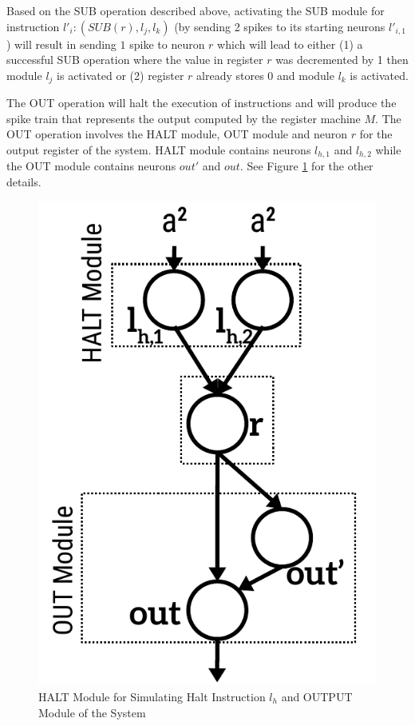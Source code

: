 \documentclass[smallextended]{svjour3}
\begin{document}

Based on the SUB operation described above, activating the SUB module for instruction $l'_i:(SUB(r),l_j,l_k)$ (by sending 2 spikes to its starting 
neurons  $l'_{i,1}$) will result in sending $1$ spike to neuron $r$ which will lead to either (1) a successful SUB operation where the value in 
register $r$ was decremented by 1 then module $l_j$ is activated or (2) register $r$ already stores 0 and module $l_k$ is activated.


The OUT operation will halt the execution of instructions and will produce the spike train that represents the output computed by the register 
machine $M.$ The OUT operation involves the HALT module, OUT module and neuron $r$ for the output register of the system. HALT module contains 
neurons $l_{h,1}$ and $l_{h,2}$ while the OUT module contains neurons $out'$ and $out$. See Figure \ref{fig-halt} for the other details.

   
\begin{figure}
\begin{center}
\includegraphics[scale=0.50]{Fig3.pdf}
\caption{HALT Module for Simulating Halt Instruction $l_h$ and OUTPUT Module of the System}
\label{fig-halt}
\end{center}
\end{figure}   
\end{document}

